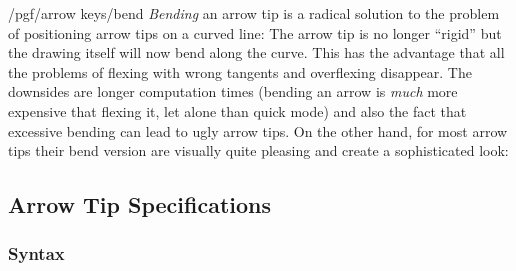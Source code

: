 \begin{key}{/pgf/arrow keys/bend}
  \emph{Bending} an arrow tip is a radical solution to the problem of
  positioning arrow tips on a curved line: The arrow tip is no longer
  ``rigid'' but the drawing itself will now bend along the curve. This
  has the advantage that all the problems of flexing with wrong
  tangents and overflexing disappear. The downsides are longer
  computation times (bending an arrow is \emph{much} more expensive
  that flexing it, let alone than quick mode) and also the fact that
  excessive bending can lead to ugly arrow tips. On the other hand,
  for most arrow tips their bend version are visually quite pleasing
  and create a sophisticated look:
\begin{codeexample}[]
\end{codeexample}  
\begin{codeexample}[]
\end{codeexample}  
\begin{codeexample}[]
\end{codeexample}  
\end{key}






\subsection{Arrow Tip Specifications}
\label{section-arrow-spec}

\subsubsection{Syntax}

